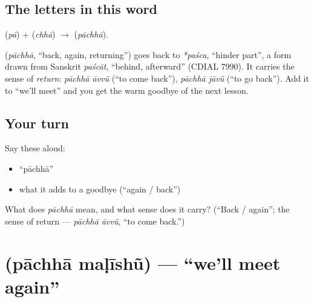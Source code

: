 \subsection*{The letters in this word}
\textbf{} (\emph{pā}) + \textbf{} (\emph{chhā}) $\to$ \textbf{} (\emph{pāchhā}).

\begin{cousinweb}
\textbf{} (\emph{pāchhā}, \textquotedblleft{}back, again, returning\textquotedblright{}) goes back to \emph{*paśca}, \textquotedblleft{}hinder part\textquotedblright{}, a form drawn from Sanskrit \emph{paścāt}, \textquotedblleft{}behind, afterward\textquotedblright{} (CDIAL 7990). It carries the sense of \emph{return}: \emph{pāchhā āvvũ} (\textquotedblleft{}to come back\textquotedblright{}), \emph{pāchhā jāvũ} (\textquotedblleft{}to go back\textquotedblright{}). Add it to \textquotedblleft{}we'll meet\textquotedblright{} and you get the warm goodbye of the next lesson.
\end{cousinweb}

\subsection*{Your turn}
Say these aloud:

\begin{itemize}
\raggedright
  \item \textquotedblleft{}pāchhā\textquotedblright{}
  \item what it adds to a goodbye (\textquotedblleft{}again / back\textquotedblright{})
\end{itemize}

\begin{tcolorbox}[breakable,colback=teal!4,colframe=teal!35!black,title={Before you move on}]
What does \emph{pāchhā} mean, and what sense does it carry? (\textquotedblleft{}Back / again\textquotedblright{}; the sense of return — \emph{pāchhā āvvũ}, \textquotedblleft{}to come back.\textquotedblright{})
\end{tcolorbox}
\section[\texorpdfstring{\gu{પાછા} \gu{મળીશું} (pāchhā maḷīshũ)}{પાછા મળીશું (pāchhā maḷīshũ)}]{  (pāchhā maḷīshũ) — \textquotedblleft{}we'll meet again\textquotedblright{}}

\label{lesson:GU-C04-pachha-malishun}




